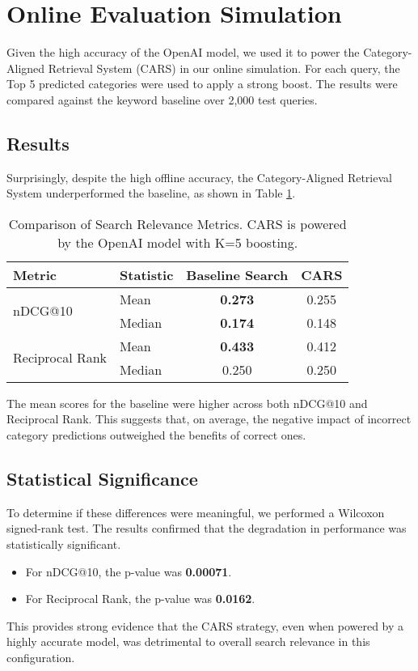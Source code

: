 \documentclass[12pt, a4paper]{article}
\begin{document}
\section{Online Evaluation Simulation}

Given the high accuracy of the OpenAI model, we used it to power the Category-Aligned Retrieval System (CARS) in our online simulation. For each query, the Top 5 predicted categories were used to apply a strong boost. The results were compared against the keyword baseline over 2,000 test queries.

\subsection{Results}
Surprisingly, despite the high offline accuracy, the Category-Aligned Retrieval System underperformed the baseline, as shown in Table \ref{tab:search_metrics}.

\begin{table}[h!]
\centering
\caption{Comparison of Search Relevance Metrics. CARS is powered by the OpenAI model with K=5 boosting.}
\label{tab:search_metrics}
\begin{tabular}{llcc}
\toprule
\textbf{Metric} & \textbf{Statistic} & \textbf{Baseline Search} & \textbf{CARS} \\
\midrule
\multirow{2}{*}{nDCG@10} & Mean & \textbf{0.273} & 0.255 \\
& Median & \textbf{0.174} & 0.148 \\
\midrule
\multirow{2}{*}{Reciprocal Rank} & Mean & \textbf{0.433} & 0.412 \\
& Median & 0.250 & 0.250 \\
\bottomrule
\end{tabular}
\end{table}

The mean scores for the baseline were higher across both nDCG@10 and Reciprocal Rank. This suggests that, on average, the negative impact of incorrect category predictions outweighed the benefits of correct ones.

\subsection{Statistical Significance}
To determine if these differences were meaningful, we performed a Wilcoxon signed-rank test. The results confirmed that the degradation in performance was statistically significant.
\begin{itemize}
\item For nDCG@10, the p-value was \textbf{0.00071}.
\item For Reciprocal Rank, the p-value was \textbf{0.0162}.
\end{itemize}
This provides strong evidence that the CARS strategy, even when powered by a highly accurate model, was detrimental to overall search relevance in this configuration.
\end{document}
